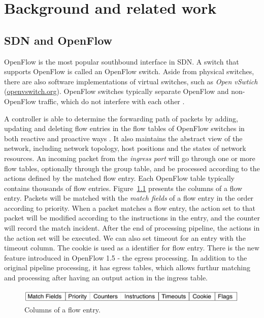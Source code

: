 \chapter{Background and related work}
\section{SDN and OpenFlow}
\label{SDN and OpenFlow}
OpenFlow is the most popular southbound interface in SDN. A switch that supports OpenFlow is called an OpenFlow switch. Aside from physical switches, there are also software implementations of virtual switches, such as \textit{Open vSwtich} (\url{openvswitch.org}). OpenFlow switches typically separate OpenFlow and non-OpenFlow traffic, which do not interfere with each other \cite{HP_SPEC}.

A controller is able to determine the forwarding path of packets by adding, updating and deleting flow entries in the flow tables of OpenFlow switches in both reactive and proactive ways \cite{OF_SPEC}. It also maintains the abstract view of the network, including network topology, host positions and the states of network resources. An incoming packet from the \textit{ingress port} will go through one or more flow tables, optionally through the group table, and be processed according to the actions defined by the matched flow entry. Each OpenFlow table typically contains thousands of flow entries. Figure~\ref{FE_Col} presents the columns of a flow entry. Packets will be matched with the \textit{match fields} of a flow entry in the order according to priority. When a packet matches a flow entry, the action set to that packet will be modified according to the instructions in the entry, and the counter will record the match incident. After the end of processing pipeline, the actions in the action set will be executed. We can also set timeout for an entry with the timeout column. The cookie is used as a identifier for flow entry. There is the new feature introduced in OpenFlow 1.5 - the egress processing. In addition to the original pipeline processing, it has egress tables, which allows furthur matching and processing after having an output action in the ingress table. \cite{OF_SPEC_15}


\begin{figure}[H]
\begin{center} 
\includegraphics[width=1\textwidth]{figures/columns_of_flow_entry.png}
\end{center}
\caption{Columns of a flow entry.}
\label{FE_Col}
\end{figure}

